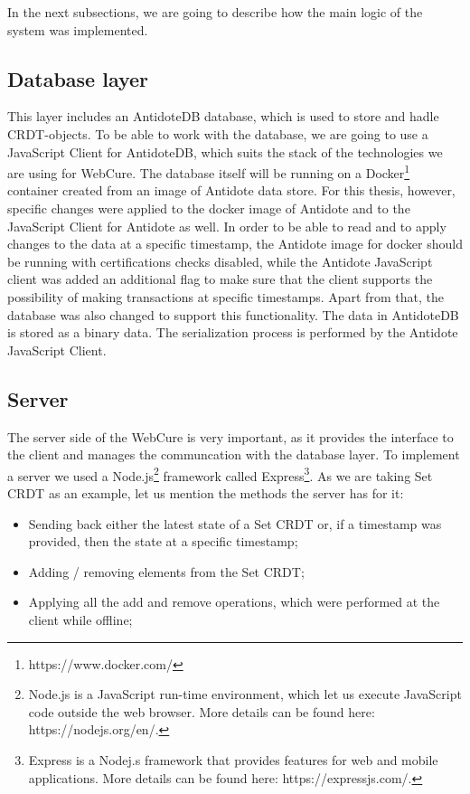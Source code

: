 In the next subsections, we are going to describe how the main logic of the system was implemented.

\subsection{Database layer}

This layer includes an AntidoteDB database, which is used to store and hadle CRDT-objects. To be able to work with the database, we are going to use a JavaScript Client for AntidoteDB\cite{52}, which suits the stack of the technologies we are using for WebCure. The database itself will be running on a Docker\footnote{https://www.docker.com/} container created from an image of Antidote data store. For this thesis, however, specific changes were applied to the docker image of Antidote and to the JavaScript Client for Antidote as well. In order to be able to read and to apply changes to the data at a specific timestamp, the Antidote image for docker should be running with certifications checks disabled, while the Antidote JavaScript client was added an additional flag to make sure that the client supports the possibility of making transactions at specific timestamps. Apart from that, the database was also changed to support this functionality. The data in AntidoteDB is stored as a binary data. The serialization process is performed by the Antidote JavaScript Client.

\subsection{Server}

The server side of the WebCure is very important, as it provides the interface to the client and manages the communcation with the database layer. To implement a server we used a Node.js\footnote{Node.js is a JavaScript run-time environment, which let us execute JavaScript code outside the web browser. More details can be found here: https://nodejs.org/en/.} framework called Express\footnote{Express is a Nodej.s framework that provides features for web and mobile applications. More details can be found here: https://expressjs.com/.}. As we are taking Set CRDT as an example, let us mention the methods the server has for it:

\begin{itemize}
    \item {Sending back either the latest state of a Set CRDT or, if a timestamp was provided, then the state at a specific timestamp;}
    \item {Adding / removing elements from the Set CRDT;}
    \item {Applying all the add and remove operations, which were performed at the client while offline;}
\end{itemize}

